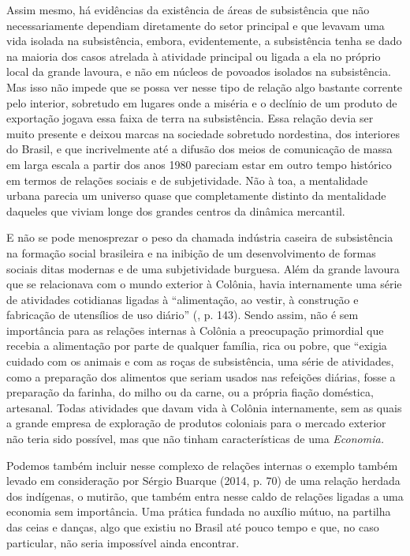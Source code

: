 {Assim mesmo, há evidências da existência de áreas de subsistência que
não necessariamente dependiam diretamente do setor principal e que
levavam uma vida isolada na subsistência, embora, evidentemente, a
subsistência tenha se dado na maioria dos casos atrelada à atividade
principal ou ligada a ela no próprio local da grande lavoura, e não em
núcleos de povoados isolados na subsistência. Mas isso não impede que se
possa ver nesse tipo de relação algo bastante corrente pelo interior,
sobretudo em lugares onde a miséria e o declínio de um produto de
exportação jogava essa faixa de terra na subsistência. Essa relação
devia ser muito presente e deixou marcas na sociedade sobretudo
nordestina, dos interiores do Brasil, e que incrivelmente até a difusão
dos meios de comunicação de massa em larga escala a partir dos anos 1980
pareciam estar em outro tempo histórico em termos de relações sociais e
de subjetividade. Não à toa, a mentalidade urbana parecia um universo
quase que completamente distinto da mentalidade daqueles que viviam
longe dos grandes centros da dinâmica mercantil.

E não se pode menosprezar o peso da chamada indústria caseira de
subsistência na formação social brasileira e na inibição de um
desenvolvimento de formas sociais ditas modernas e de uma subjetividade
burguesa. Além da grande lavoura que se relacionava com o mundo exterior
à Colônia, havia internamente uma série de atividades cotidianas ligadas
à ``alimentação, ao vestir, à construção e fabricação de utensílios de
uso diário'' (, p. 143). Sendo assim, não é sem importância para
as relações internas à Colônia a preocupação primordial que recebia a
alimentação por parte de qualquer família, rica ou pobre, que ``exigia
cuidado com os animais e com as roças de subsistência, uma série de
atividades, como a preparação dos alimentos que seriam usados nas
refeições diárias, fosse a preparação da farinha, do milho ou da carne,
ou a própria fiação doméstica, artesanal. Todas atividades que davam
vida à Colônia internamente, sem as quais a grande empresa de exploração
de produtos coloniais para o mercado exterior não teria sido possível,
mas que não tinham características de uma \emph{Economia.}

Podemos também incluir nesse complexo de relações internas o exemplo
também levado em consideração por Sérgio Buarque (2014, p. 70) de uma
relação herdada dos indígenas, o mutirão, que também entra nesse caldo
de relações ligadas a uma economia sem importância. Uma prática fundada
no auxílio mútuo, na partilha das ceias e danças, algo que existiu no
Brasil até pouco tempo e que, no caso particular, não seria impossível
ainda encontrar.

}
